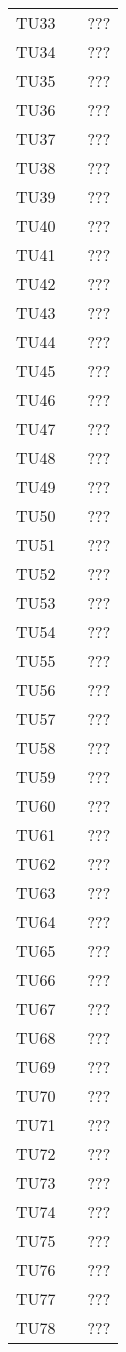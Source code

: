 {\begin{longtable}{ c  C{8.5cm} C{3cm}}
TU33 &  & ??? \\
TU34 &  & ??? \\
TU35 &  & ??? \\
TU36 &  & ??? \\
TU37 &  & ??? \\
TU38 &  & ??? \\
TU39 &  & ??? \\
TU40 &  & ??? \\
TU41 &  & ??? \\
TU42 &  & ??? \\
TU43 &  & ??? \\
TU44 &  & ??? \\
TU45 &  & ??? \\
TU46 &  & ??? \\
TU47 &  & ??? \\
TU48 &  & ??? \\
TU49 &  & ??? \\
TU50 &  & ??? \\
TU51 &  & ??? \\
TU52 &  & ??? \\
TU53 &  & ??? \\
TU54 &  & ??? \\
TU55 &  & ??? \\
TU56 &  & ??? \\
TU57 &  & ??? \\
TU58 &  & ??? \\
TU59 &  & ??? \\
TU60 &  & ??? \\
TU61 &  & ??? \\
TU62 &  & ??? \\
TU63 &  & ??? \\
TU64 &  & ??? \\
TU65 &  & ??? \\
TU66 &  & ??? \\
TU67 &  & ??? \\
TU68 &  & ??? \\
TU69 &  & ??? \\
TU70 &  & ??? \\
TU71 &  & ??? \\
TU72 &  & ??? \\
TU73 &  & ??? \\
TU74 &  & ??? \\
TU75 &  & ??? \\
TU76 &  & ??? \\
TU77 &  & ??? \\
TU78 &  & ??? \\

\end{longtable}}
